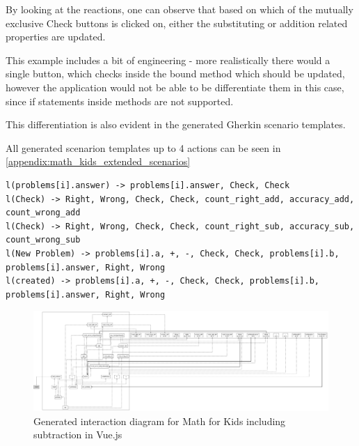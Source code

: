By looking at the reactions, one can observe that based on which of the mutually exclusive Check buttons is clicked on, either the substituting or addition related properties are updated. 

This example includes a bit of engineering - more realistically there would a single button, which checks inside the bound method which should be updated, however the application would not be able to be differentiate them in this case, since if statements inside methods are not supported.

This differentiation is also evident in the generated Gherkin scenario templates. 

All generated scenarion templates up to 4 actions can be seen in  \ref{appendix:math_kids_extended_scenarios}

\begin{lstlisting}
l(problems[i].answer) -> problems[i].answer, Check, Check
l(Check) -> Right, Wrong, Check, Check, count_right_add, accuracy_add, count_wrong_add
l(Check) -> Right, Wrong, Check, Check, count_right_sub, accuracy_sub, count_wrong_sub
l(New Problem) -> problems[i].a, +, -, Check, Check, problems[i].b, problems[i].answer, Right, Wrong
l(created) -> problems[i].a, +, -, Check, Check, problems[i].b, problems[i].answer, Right, Wrong
\end{lstlisting}

\begin{figure}[H]
    \includegraphics[width=\textwidth]{images/diagram_list_add_sub.png}
     \caption{Generated interaction diagram for Math for Kids including subtraction in Vue.js}
     \label{fig:diagram_list_complex}
\end{figure}










